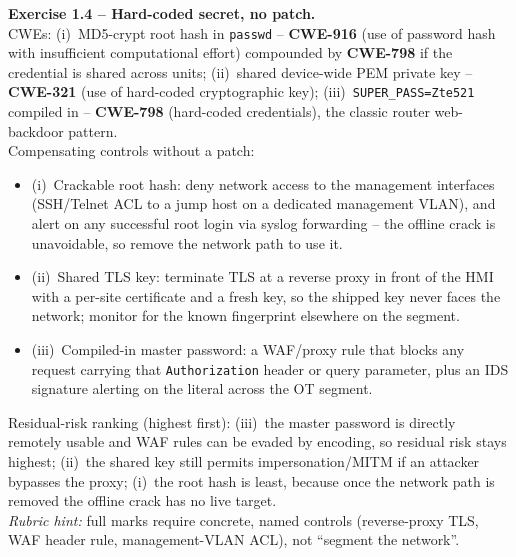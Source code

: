 \documentclass[11pt,a4paper]{article}
\begin{document}
\begin{solutionbox}
\textbf{Exercise 1.4 -- Hard-coded secret, no patch.}\\[2pt]
CWEs: (i)~MD5-crypt root hash in \texttt{passwd} -- \textbf{CWE-916} (use of password hash with
insufficient computational effort) compounded by \textbf{CWE-798} if the credential is shared
across units; (ii)~shared device-wide PEM private key -- \textbf{CWE-321} (use of hard-coded
cryptographic key); (iii)~\texttt{SUPER\_PASS=Zte521} compiled in -- \textbf{CWE-798}
(hard-coded credentials), the classic router web-backdoor pattern.\\[2pt]
Compensating controls without a patch:
\begin{itemize}\setlength{\itemsep}{0pt}
  \item (i)~Crackable root hash: deny network access to the management interfaces (SSH/Telnet
        ACL to a jump host on a dedicated management VLAN), and alert on any successful root
        login via syslog forwarding -- the offline crack is unavoidable, so remove the network
        path to use it.
  \item (ii)~Shared TLS key: terminate TLS at a reverse proxy in front of the HMI with a
        per-site certificate and a fresh key, so the shipped key never faces the network;
        monitor for the known fingerprint elsewhere on the segment.
  \item (iii)~Compiled-in master password: a WAF/proxy rule that blocks any request carrying
        that \texttt{Authorization} header or query parameter, plus an IDS signature alerting on
        the literal across the OT segment.
\end{itemize}
Residual-risk ranking (highest first): (iii)~the master password is directly remotely usable and
WAF rules can be evaded by encoding, so residual risk stays highest; (ii)~the shared key still
permits impersonation/MITM if an attacker bypasses the proxy; (i)~the root hash is least, because
once the network path is removed the offline crack has no live target.\\[2pt]
\emph{Rubric hint:} full marks require concrete, named controls (reverse-proxy TLS, WAF
header rule, management-VLAN ACL), not ``segment the network''.
\end{solutionbox}
\end{document}
